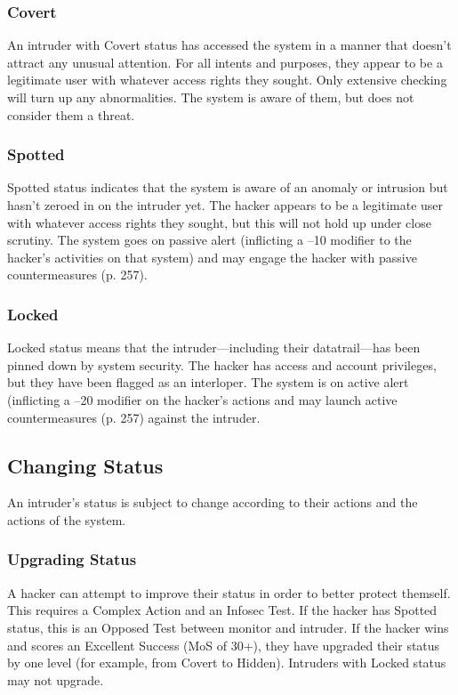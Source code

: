 \subsubsection{Covert}

An intruder with Covert status has accessed the 
system in a manner that doesn't attract any unusual 
attention. For all intents and purposes, they appear 
to be a legitimate user with whatever access rights 
they sought. Only extensive checking will turn up any 
abnormalities. The system is aware of them, but does 
not consider them a threat.

\subsubsection{Spotted}

Spotted status indicates that the system is aware of an 
anomaly or intrusion but hasn't zeroed in on the intruder
yet. The hacker appears to be a legitimate user
with whatever access rights they sought, but this will 
not hold up under close scrutiny. The system goes on 
passive alert (inflicting a –10 modifier to the hacker's 
activities on that system) and may engage the hacker 
with passive countermeasures (p. 257).

\subsubsection{Locked}

Locked status means that the intruder—including their 
datatrail—has been pinned down by system security. 
The hacker has access and account privileges, but they 
have been flagged as an interloper. The system is on 
active alert (inflicting a –20 modifier on the hacker's actions
and may launch active countermeasures (p. 257)
against the intruder.

\subsection{Changing Status}

An intruder's status is subject to change according to 
their actions and the actions of the system.

\subsubsection{Upgrading Status}

A hacker can attempt to improve their status in order 
to better protect themself. This requires a Complex 
Action and an Infosec Test. If the hacker has Spotted 
status, this is an Opposed Test between monitor and 
intruder. If the hacker wins and scores an Excellent 
Success (MoS of 30+), they have upgraded their status 
by one level (for example, from Covert to Hidden). 
Intruders with Locked status may not upgrade.

